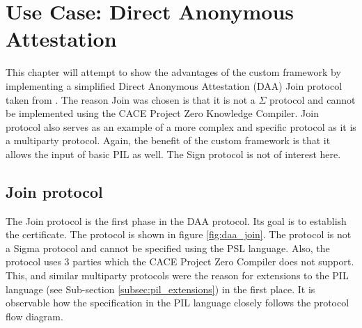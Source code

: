 \chapter{Use Case: Direct Anonymous Attestation}

This chapter will attempt to show the advantages of the custom
framework by implementing a simplified Direct Anonymous Attestation
(DAA) Join protocol taken from \cite{simplified_daa}. The reason Join
was chosen is that it is not a $\Sigma$ protocol and cannot be
implemented using the CACE Project Zero Knowledge Compiler. Join
protocol also serves as an example of a more complex and specific
protocol as it is a multiparty protocol. Again, the benefit
of the custom framework is that it allows the input of basic PIL as
well. The Sign protocol is not of interest here.


\section{Join protocol}

The Join protocol is the first phase in the DAA protocol. Its goal is
to establish the certificate. The protocol is shown in figure
\ref{fig:daa_join}. The protocol is not a Sigma protocol and cannot be
specified using the PSL language. Also, the protocol uses 3 parties
which the CACE Project Zero Compiler does not support. This, and
similar multiparty protocols were the reason for extensions to the PIL
language (see Sub-section \ref{subsec:pil_extensions}) in the first
place. It is observable how the specification in the PIL language
closely follows the protocol flow diagram.

